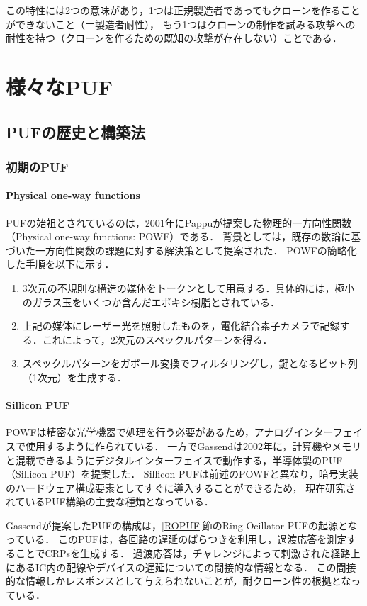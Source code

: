 \documentclass[technicalreport]{ieicej} %
\begin{document}
この特性には2つの意味があり，1つは正規製造者であってもクローンを作ることができないこと（＝製造者耐性），
もう1つはクローンの制作を試みる攻撃への耐性を持つ（クローンを作るための既知の攻撃が存在しない）ことである．


\section{様々なPUF}
\subsection{PUFの歴史と構築法}
\subsubsection{初期のPUF}
\paragraph{Physical one-way functions}
PUFの始祖とされているのは，2001年にPappuが提案した物理的一方向性関数（Physical one-way functions: POWF）\cite{pappu}である．
背景としては，既存の数論に基づいた一方向性関数の課題に対する解決策として提案された．
POWFの簡略化した手順を以下に示す．
\begin{enumerate}
  \item 3次元の不規則な構造の媒体をトークンとして用意する．具体的には，極小のガラス玉をいくつか含んだエポキシ樹脂とされている．
  \item 上記の媒体にレーザー光を照射したものを，電化結合素子カメラで記録する．これによって，2次元のスペックルパターンを得る．
  \item スペックルパターンをガボール変換でフィルタリングし，鍵となるビット列（1次元）を生成する．
\end{enumerate}

\paragraph{Sillicon PUF}
\label{SilliconPUF}
POWFは精密な光学機器で処理を行う必要があるため，アナログインターフェイスで使用するように作られている．
一方でGassendは2002年に，計算機やメモリと混載できるようにデジタルインターフェイスで動作する，半導体製のPUF（Sillicon PUF）を提案した\cite{gassend1}．
Sillicon PUFは前述のPOWFと異なり，暗号実装のハードウェア構成要素としてすぐに導入することができるため，
現在研究されているPUF構築の主要な種類となっている．

Gassendが提案したPUF\cite{gassend1}の構成は，\ref{ROPUF}節のRing Ocillator PUFの起源となっている．
このPUFは，各回路の遅延のばらつきを利用し，過渡応答を測定することでCRPsを生成する．
過渡応答は，チャレンジによって刺激された経路上にあるIC内の配線やデバイスの遅延についての間接的な情報となる．
この間接的な情報しかレスポンスとして与えられないことが，耐クローン性の根拠となっている．
\end{document}
